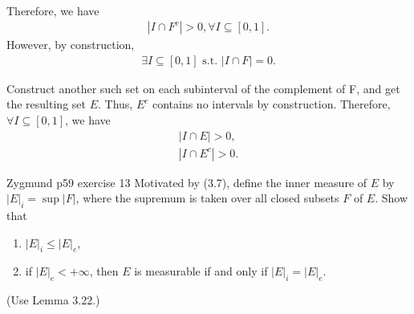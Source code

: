 \documentclass[UTF8,a4paper,10pt]{article}
\begin{document}
\begin{solution}\,

Therefore, we have
\begin{equation*}
  \begin{aligned}
    |I\cap F^c| > 0,  \forall I\subseteq[0,1] .
  \end{aligned}
\end{equation*}
However, by construction,
\begin{equation*}
  \begin{aligned}
    \exists I\subseteq[0,1]\text{ s.t. }|I\cap F| = 0.
  \end{aligned}
\end{equation*}

Construct another such set on each subinterval of the complement of F, and get the resulting set \(E\). Thus, \(E^c\) contains no intervals by construction. Therefore, \(\forall I\subseteq[0,1]\), we have
\begin{equation*}
  \begin{aligned}
    |I\cap E| > 0,\\
    |I\cap E^c| > 0.
  \end{aligned}
\end{equation*}

\end{solution}


\pagebreak
\begin{Problem}[]{Zygmund p59 exercise 13}
  Motivated by (3.7), define the inner measure of $E$ by $|E|_i = \sup |F|$, where
  the supremum is taken over all closed subsets $F$ of $E$. Show that
  \begin{enumerate}
    \item $|E|_i \leq |E|_e$,
    \item if $|E|_e < +\infty$, then $E$ is measurable if and only if $|E|_i = |E|_e$.
  \end{enumerate}
  (Use Lemma 3.22.)

\end{Problem}
\end{document}
